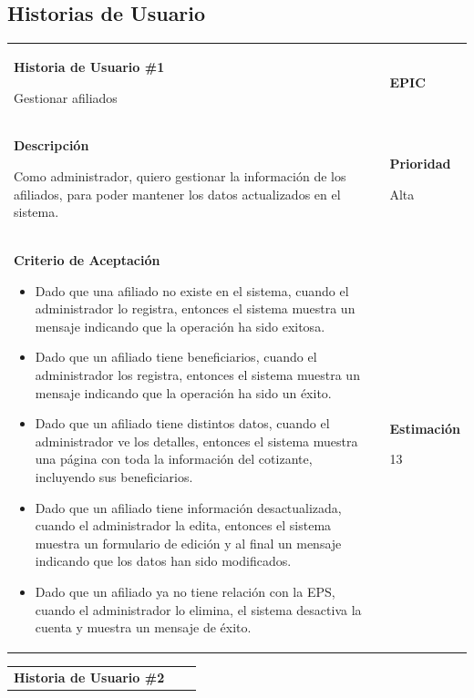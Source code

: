 \documentclass[12pt,a4paper]{article}
\begin{document}
\subsection{Historias de Usuario}
\begin{center}
\begin{tabular}{|>{\columncolor[RGB]{215, 215, 215}} p{10cm} >{\columncolor[RGB]{215, 215, 215}} c >{\columncolor[RGB]{215, 215, 215}} p{2.5cm}|}
\hline 
\textbf{Historia de Usuario \#1}

Gestionar afiliados & & \textbf{{\Large EPIC}} \\ 
\textbf{Descripción}

Como administrador, quiero gestionar la información de los afiliados, para poder mantener los datos actualizados en el sistema. &  & \textbf{Prioridad}

Alta\\

\textbf{Criterio de Aceptación}

\begin{itemize}
\item Dado que una afiliado no existe en el sistema, cuando el administrador lo registra, entonces el sistema muestra un mensaje indicando que la operación ha sido exitosa.
\item Dado que un afiliado tiene beneficiarios, cuando el administrador los registra, entonces el sistema muestra un mensaje indicando que la operación ha sido un éxito.
\item Dado que un afiliado tiene distintos datos, cuando el administrador ve los detalles, entonces el sistema muestra una página con toda la información del cotizante, incluyendo sus beneficiarios.
\item Dado que un afiliado tiene información desactualizada, cuando el administrador la edita, entonces el sistema muestra un formulario de edición y al final un mensaje indicando que los datos han sido modificados.
\item Dado que un afiliado ya no tiene relación con la EPS, cuando el administrador lo elimina, el sistema desactiva la cuenta y muestra un mensaje de éxito.
\end{itemize} & & \textbf{Estimación}

13 \\ 
\hline 
\end{tabular}
\vspace{5mm}

\begin{tabular}{| p{10cm} c p{2.5cm}|}
\hline 
\textbf{Historia de Usuario \#2}


\end{tabular}
\end{center}
\end{document}
